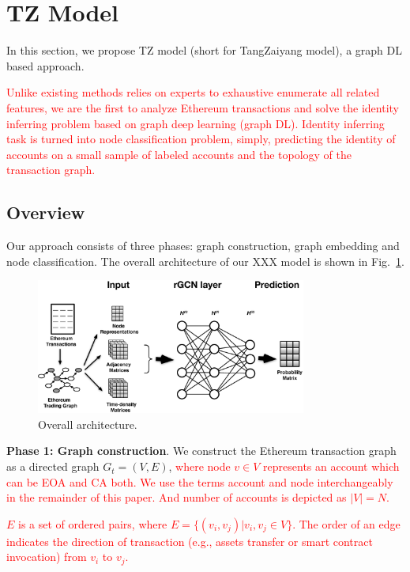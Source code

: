 \section{TZ Model}
In this section, we propose TZ model (short for TangZaiyang model), a
graph DL based approach.

\textcolor{red}{Unlike existing methods relies on experts to exhaustive enumerate all related features, we are the first to analyze Ethereum transactions and solve the identity inferring problem based on graph deep learning (graph DL). Identity inferring task is turned into node classification problem, simply, predicting the identity of accounts on a small sample of labeled accounts and the topology of the transaction graph.}


\subsection{Overview}
\label{subsec:methodology}
Our approach consists of three phases: graph construction, graph embedding and node classification.
The overall architecture of our XXX model is shown in Fig.~\ref{fig:architecture}.

\begin{figure}[htbp]
	\centering
	\includegraphics[width=3.5in]{fig/architecture.eps}
	\caption{Overall architecture.}
	\label{fig:architecture}
\end{figure}

\textbf{Phase 1: Graph construction}. We construct the Ethereum transaction graph as a directed graph $G_{t}=(V,E)$, \textcolor{red}{where node $v \in V$ represents an account which can be EOA and CA both. We use the terms account and node interchangeably in the remainder of this paper. And number of accounts is depicted as $|V|=N$.}

\textcolor{red}{$E$ is a set of ordered pairs, where $E=\{(v_i,v_j)|v_i,v_j \in V\}$. The order of an edge indicates the direction of transaction (e.g., assets transfer or smart contract invocation) from $v_i$ to $v_j$.} %


